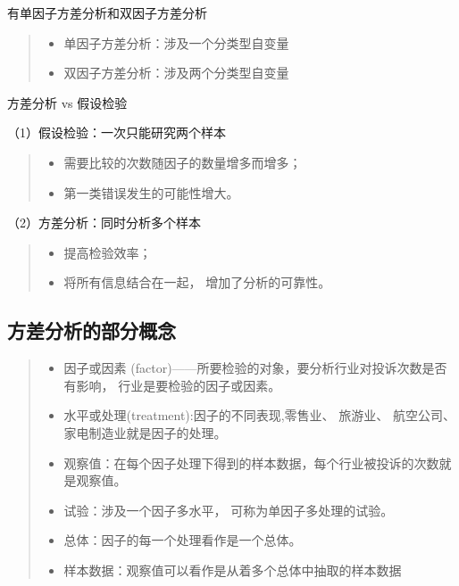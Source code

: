 \documentclass[]{ctexbook}
\providecommand{\tightlist}{%
  \setlength{\itemsep}{0pt}\setlength{\parskip}{0pt}}
\begin{document}
有单因子方差分析和双因子方差分析

\begin{quote}
\begin{itemize}
\tightlist
\item
  单因子方差分析：涉及一个分类型自变量
\item
  双因子方差分析：涉及两个分类型自变量
\end{itemize}
\end{quote}

方差分析 vs 假设检验

（1）假设检验：一次只能研究两个样本

\begin{quote}
\begin{itemize}
\tightlist
\item
  需要比较的次数随因子的数量增多而增多；
\item
  第一类错误发生的可能性增大。
\end{itemize}
\end{quote}

（2）方差分析：同时分析多个样本

\begin{quote}
\begin{itemize}
\tightlist
\item
  提高检验效率；
\item
  将所有信息结合在一起， 增加了分析的可靠性。
\end{itemize}
\end{quote}

\hypertarget{ux65b9ux5deeux5206ux6790ux7684ux90e8ux5206ux6982ux5ff5}{%
\subsection{方差分析的部分概念}\label{ux65b9ux5deeux5206ux6790ux7684ux90e8ux5206ux6982ux5ff5}}

\begin{quote}
\begin{itemize}
\tightlist
\item
  因子或因素 (factor)------所要检验的对象，要分析行业对投诉次数是否有影响， 行业是要检验的因子或因素。
\item
  水平或处理(treatment):因子的不同表现,零售业、 旅游业、 航空公司、 家电制造业就是因子的处理。
\item
  观察值：在每个因子处理下得到的样本数据，每个行业被投诉的次数就是观察值。
\item
  试验：涉及一个因子多水平， 可称为单因子多处理的试验。
\item
  总体：因子的每一个处理看作是一个总体。
\item
  样本数据：观察值可以看作是从着多个总体中抽取的样本数据
\end{itemize}
\end{quote}
\end{document}
